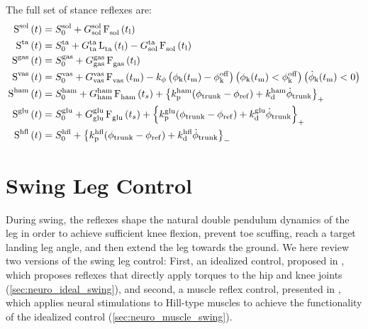 \begin{fullwidth}
The full set of stance reflexes are:
\begin{align}    
    \func{S}[][\tn{sol}]{t} &= S_0^\tn{sol} + 
        G_\tn{sol}^\tn{sol} \func{F}[\tn{sol}][]{t_\tn{l}} \\
    \func{S}[][\tn{ta}]{t} &= S_0^\tn{ta} + 
        G_\tn{ta}^\tn{ta} \func{L}[\tn{ta}][]{t_\tn{l}} - G_\tn{sol}^\tn{ta} 
        \func{F}[\tn{sol}][]{t_\tn{l}}\\
    \func{S}[][\tn{gas}]{t} &= S_0^\tn{gas} + 
        G_\tn{gas}^\tn{gas} \func{F}[\tn{gas}][]{t_\tn{l}} 
        \label{eq:gas_stim_full}\\
    \func{S}[][\tn{vas}]{t} &= S_0^\tn{vas} + 
        G_\tn{vas}^\tn{vas} \func{F}[\tn{vas}][]{t_\tn{m}} 
        -k_\phi \left( \phi_\tn{k}(t_\tn{m}) - \phi_\tn{k}^\tn{off} \right) 
        \left( \phi_\tn{k}(t_\tn{m}) < \phi_\tn{k}^\tn{off} \right)
        \left( \dot \phi_\tn{k}(t_\tn{m}) < 0\right)    
        \label{eq:vas_stim_full}\\
    \func{S}[][\tn{ham}]{t} &= S_0^\tn{ham} + 
        G_\tn{ham}^\tn{ham} \func{F}[\tn{ham}][]{t_{s}} 
        + \left\{ k_\tn{p}^\tn{ham} (\phi_{\tn{trunk}} - \phi_{\tn{ref}}) 
        + k_\tn{d}^\tn{ham} \dot{\phi}_{\tn{trunk}} \right\}_+
        \label{eq:ham_stim_full} \\
    \func{S}[][\tn{glu}]{t} &= S_0^\tn{glu} + 
        G_\tn{glu}^\tn{glu} \func{F}[\tn{glu}][]{t_{s}}
        + \left\{ k_\tn{p}^\tn{glu} (\phi_{\tn{trunk}} - \phi_{\tn{ref}}) 
        + k_\tn{d}^\tn{glu} \dot{\phi}_{\tn{trunk}} \right\}_+  \\
    \func{S}[][\tn{hfl}]{t} &= S_0^\tn{hfl} + 
        \left\{ k_\tn{p}^\tn{hfl} (\phi_{\tn{trunk}} - \phi_{\tn{ref}}) 
        + k_\tn{d}^\tn{hfl} \dot{\phi}_{\tn{trunk}} \right\}_- 
\end{align}    
\end{fullwidth}

\section{Swing Leg Control}\label{sec:neuro_swing_reflexes} 

During swing, the reflexes shape the natural double pendulum dynamics of the leg
in order to achieve sufficient knee flexion, prevent toe scuffing, reach a
target landing leg angle, and then extend the leg towards the ground. We here
review two versions of the swing leg control: First, an idealized control,
proposed in \citet{desai2012robust}, which proposes reflexes that directly apply
torques to the hip and knee joints (\cref{sec:neuro_ideal_swing}), and second, a
muscle reflex control, presented in \citet{desai2013muscle}, which applies
neural stimulations to Hill-type muscles to achieve the functionality of the
idealized control (\cref{sec:neuro_muscle_swing}).

